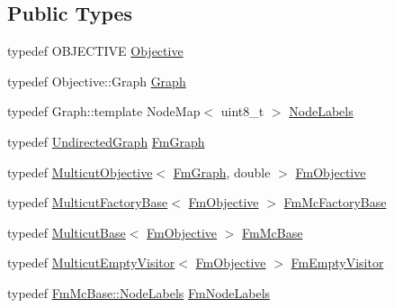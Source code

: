 \subsection*{Public Types}
\begin{DoxyCompactItemize}
\item 
typedef O\+B\+J\+E\+C\+T\+I\+V\+E \hyperlink{classnifty_1_1graph_1_1FusionMove_a1318f004b56344164b0845f7c826e9db}{Objective}
\item 
typedef Objective\+::\+Graph \hyperlink{classnifty_1_1graph_1_1FusionMove_a76f1d4cff7ee7c3f6033e23ffb761c55}{Graph}
\item 
typedef Graph\+::template Node\+Map$<$ uint8\+\_\+t $>$ \hyperlink{classnifty_1_1graph_1_1FusionMove_a9e4014ff55a0dcf7e4bb6670fe0d0a85}{Node\+Labels}
\item 
typedef \hyperlink{classnifty_1_1graph_1_1UndirectedGraph}{Undirected\+Graph} \hyperlink{classnifty_1_1graph_1_1FusionMove_a9192ebd1542c7525e8b3f7416ec92f63}{Fm\+Graph}
\item 
typedef \hyperlink{classnifty_1_1graph_1_1MulticutObjective}{Multicut\+Objective}$<$ \hyperlink{classnifty_1_1graph_1_1FusionMove_a9192ebd1542c7525e8b3f7416ec92f63}{Fm\+Graph}, double $>$ \hyperlink{classnifty_1_1graph_1_1FusionMove_ad40d83951f141ac8b6fc949995916377}{Fm\+Objective}
\item 
typedef \hyperlink{classnifty_1_1graph_1_1MulticutFactoryBase}{Multicut\+Factory\+Base}$<$ \hyperlink{classnifty_1_1graph_1_1FusionMove_ad40d83951f141ac8b6fc949995916377}{Fm\+Objective} $>$ \hyperlink{classnifty_1_1graph_1_1FusionMove_a75c5190f6b01321efa3f23cb10b2dd36}{Fm\+Mc\+Factory\+Base}
\item 
typedef \hyperlink{classnifty_1_1graph_1_1MulticutBase}{Multicut\+Base}$<$ \hyperlink{classnifty_1_1graph_1_1FusionMove_ad40d83951f141ac8b6fc949995916377}{Fm\+Objective} $>$ \hyperlink{classnifty_1_1graph_1_1FusionMove_a2805f5230219c8c6118663ca5ec9d144}{Fm\+Mc\+Base}
\item 
typedef \hyperlink{namespacenifty_1_1graph_a37de21ae53be2952a5876727dadceed1}{Multicut\+Empty\+Visitor}$<$ \hyperlink{classnifty_1_1graph_1_1FusionMove_ad40d83951f141ac8b6fc949995916377}{Fm\+Objective} $>$ \hyperlink{classnifty_1_1graph_1_1FusionMove_aba3bcdc03f395f2eb0a4b2f4ea26c649}{Fm\+Empty\+Visitor}
\item 
typedef \hyperlink{classnifty_1_1graph_1_1MulticutBase_afba61ad2919d0fad20b3745af19309da}{Fm\+Mc\+Base\+::\+Node\+Labels} \hyperlink{classnifty_1_1graph_1_1FusionMove_a411fd2cd3e59b587e5399318882ee4be}{Fm\+Node\+Labels}

\end{DoxyCompactItemize}
